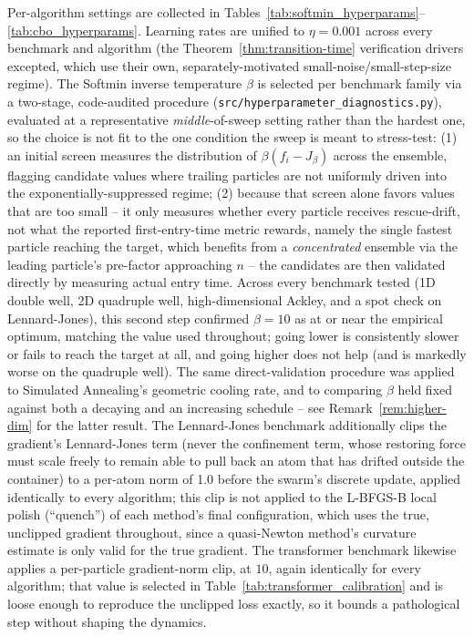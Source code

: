 \documentclass{article} %
\theoremstyle{plain}
\theoremstyle{definition}
\theoremstyle{remark}
\begin{document}
Per-algorithm settings are collected in Tables~\ref{tab:softmin_hyperparams}--\ref{tab:cbo_hyperparams}. Learning rates are unified to $\eta=0.001$ across every benchmark and algorithm (the Theorem~\ref{thm:transition-time} verification drivers excepted, which use their own, separately-motivated small-noise/small-step-size regime). The Softmin inverse temperature $\beta$ is selected per benchmark family via a two-stage, code-audited procedure (\texttt{src/hyperparameter\_diagnostics.py}), evaluated at a representative \emph{middle}-of-sweep setting rather than the hardest one, so the choice is not fit to the one condition the sweep is meant to stress-test: (1) an initial screen measures the distribution of $\beta(f_i-J_\beta)$ across the ensemble, flagging candidate values where trailing particles are not uniformly driven into the exponentially-suppressed regime; (2) because that screen alone favors values that are too small -- it only measures whether every particle receives rescue-drift, not what the reported first-entry-time metric rewards, namely the single fastest particle reaching the target, which benefits from a \emph{concentrated} ensemble via the leading particle's pre-factor approaching $n$ -- the candidates are then validated directly by measuring actual entry time. Across every benchmark tested (1D double well, 2D quadruple well, high-dimensional Ackley, and a spot check on Lennard-Jones), this second step confirmed $\beta=10$ as at or near the empirical optimum, matching the value used throughout; going lower is consistently slower or fails to reach the target at all, and going higher does not help (and is markedly worse on the quadruple well). The same direct-validation procedure was applied to Simulated Annealing's geometric cooling rate, and to comparing $\beta$ held fixed against both a decaying and an increasing schedule -- see Remark~\ref{rem:higher-dim} for the latter result. The Lennard-Jones benchmark additionally clips the gradient's Lennard-Jones term (never the confinement term, whose restoring force must scale freely to remain able to pull back an atom that has drifted outside the container) to a per-atom norm of 1.0 before the swarm's discrete update, applied identically to every algorithm; this clip is not applied to the L-BFGS-B local polish (``quench'') of each method's final configuration, which uses the true, unclipped gradient throughout, since a quasi-Newton method's curvature estimate is only valid for the true gradient. The transformer benchmark likewise applies a per-particle gradient-norm clip, at $10$, again identically for every algorithm; that value is selected in Table~\ref{tab:transformer_calibration} and is loose enough to reproduce the unclipped loss exactly, so it bounds a pathological step without shaping the dynamics.
\end{document}
